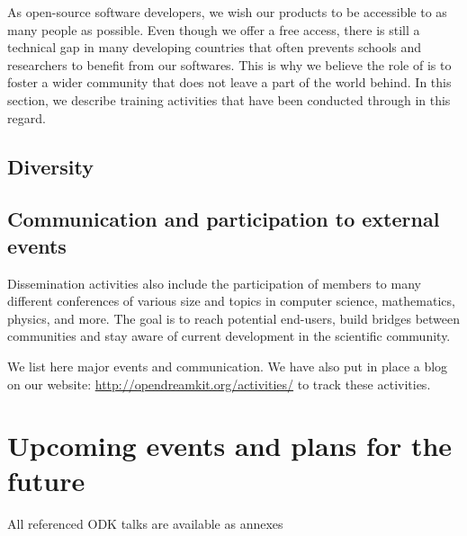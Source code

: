 \documentclass{deliverablereport}
\begin{document}
As open-source software developers, we wish our products
to be accessible to as many people as possible. Even though we offer
 a free access, there is still a technical gap in many 
developing countries that 
often prevents schools and researchers to benefit from our softwares.
This is why we believe the role of \ODK is to foster 
a wider community that does not leave a part of the world behind. In 
this section, we describe training activities that have been conducted 
through \ODK in this regard.







\subsection{Diversity}







\subsection{Communication and participation to external events}

Dissemination activities also include the participation of \ODK
members to many different conferences of various size and topics
in computer science, mathematics, physics, and more. The goal is
to reach potential end-users, build bridges between communities and stay aware 
of current development in the scientific community.

We list here major events and communication. We have also put in place
a blog on our website: \url{http://opendreamkit.org/activities/} to track
these activities.




















\section{Upcoming events and plans for the future}


\newpage\printbibliography

{\footnotesize All referenced ODK talks are available as annexes}
\end{document}
